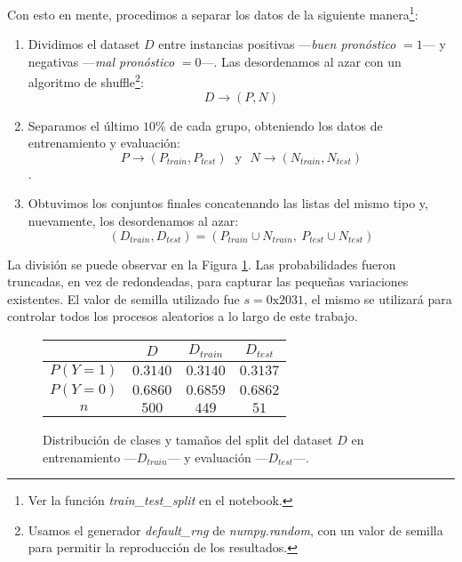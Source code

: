 Con esto en mente, procedimos a separar los datos de la siguiente manera\footnote{Ver la función \textit{train\_test\_split} en el notebook.}:

\begin{enumerate}
    \item Dividimos el dataset $D$ entre instancias positivas ---\textit{buen pronóstico} $=1$--- y negativas ---\textit{mal pronóstico} $=0$---. Las desordenamos al azar con un algoritmo de shuffle\footnote{Usamos el generador \textit{default\_rng} de \textit{numpy.random}, con un valor de semilla para permitir la reproducción de los resultados.}: $$D \rightarrow (P, N)$$
    \item Separamos el último $10\%$ de cada grupo, obteniendo los datos de entrenamiento y evaluación: $$P \rightarrow (P_{train}, P_{test})\ \ \ \text{y}\ \ \ N \rightarrow (N_{train}, N_{test})$$.
    \item Obtuvimos los conjuntos finales concatenando las listas del mismo tipo y, nuevamente, los desordenamos al azar: $$(D_{train}, D_{test}) = (P_{train} \cup N_{train},\ P_{test} \cup N_{test})$$
\end{enumerate}

\vspace{0.5em}
La división se puede observar en la Figura \ref{distribucion}. Las probabilidades fueron truncadas, en vez de redondeadas, para capturar las pequeñas variaciones existentes. El valor de semilla utilizado fue $s = \text{0x2031}$, el mismo se utilizará para controlar todos los procesos aleatorios a lo largo de este trabajo.

\vspace{0.5em}
\begin{figure}[!htbp]
    \begin{center}
        \begin{tabular}{ |c|c|c|c| } 
         \hline
                    & $D$      & $D_{train}$ & $D_{test}$ \\
        \hline
        $P(Y=1)$   & $0.3140$ & $0.3140$    & $0.3137$   \\ 
        $P(Y=0)$   & $0.6860$ & $0.6859$    & $0.6862$   \\ 
        $n$        & $500$    & $449$       & $51$       \\ 
        \hline
        \end{tabular}
    \end{center}
    \caption{Distribución de clases y tamaños del split del dataset $D$ en entrenamiento ---$D_{train}$--- y evaluación ---$D_{test}$---.} \label{distribucion}
\end{figure}
